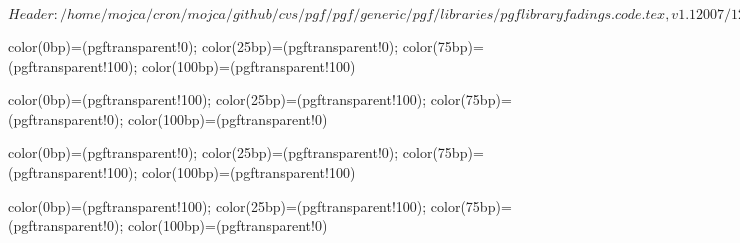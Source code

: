 %
%
%

\ProvidesFileRCS[v\pgfversion] $Header: /home/mojca/cron/mojca/github/cvs/pgf/pgf/generic/pgf/libraries/pgflibraryfadings.code.tex,v 1.1 2007/12/14 22:23:25 tantau Exp $



{color(0bp)=(pgftransparent!0); color(25bp)=(pgftransparent!0);
 color(75bp)=(pgftransparent!100); color(100bp)=(pgftransparent!100)}

{color(0bp)=(pgftransparent!100); color(25bp)=(pgftransparent!100);
 color(75bp)=(pgftransparent!0); color(100bp)=(pgftransparent!0)}

{color(0bp)=(pgftransparent!0); color(25bp)=(pgftransparent!0);
 color(75bp)=(pgftransparent!100); color(100bp)=(pgftransparent!100)}

{color(0bp)=(pgftransparent!100); color(25bp)=(pgftransparent!100);
 color(75bp)=(pgftransparent!0); color(100bp)=(pgftransparent!0)}

